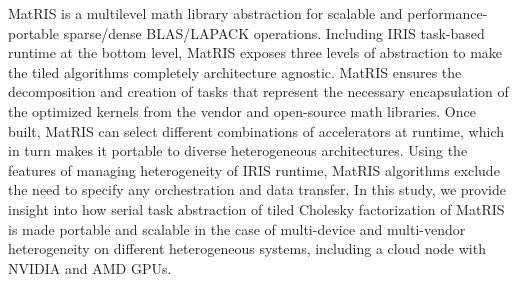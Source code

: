 MatRIS is a multilevel math library abstraction for scalable and performance-portable sparse/dense BLAS/LAPACK operations. Including IRIS task-based runtime at the bottom level, MatRIS exposes three levels of abstraction to make the tiled algorithms completely architecture agnostic. MatRIS ensures the decomposition and creation of tasks that represent the necessary encapsulation of the optimized kernels from the vendor and open-source math libraries. Once built, MatRIS can select different combinations of accelerators at runtime, which in turn makes it portable to diverse heterogeneous architectures. Using the features of managing heterogeneity of IRIS runtime, MatRIS algorithms exclude the need to specify any orchestration and data transfer. In this study, we provide insight into how serial task abstraction of tiled Cholesky factorization of MatRIS is made portable and scalable in the case of multi-device and multi-vendor heterogeneity on different heterogeneous systems, including a cloud node with NVIDIA and AMD GPUs.
